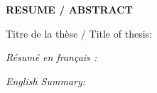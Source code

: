 
\vspace*{-3.5cm}

\begin{center}
\sffamily\large\textbf{RESUME / ABSTRACT}
\end{center}

\noindent   Titre de la thèse / Title of thesis: \MyTitle

\noindent   \sffamily\textit{Résumé en français :} \sffamily{
\begin{small}
\lipsum[2-2]
\end{small}
}

\noindent   \sffamily\textit{English Summary:}  \sffamily{
\begin{small}
\lipsum[4-4]
\end{small}
}